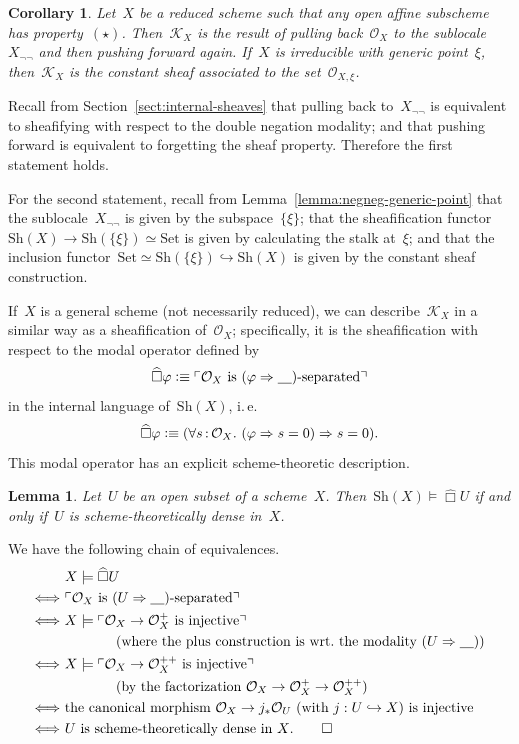 \documentclass[10pt,reqno,a4paper]{amsbook}
\makeatletter
\theoremstyle{definition}
\theoremstyle{plain}
\newtheorem{cor}[defn]{Corollary}
\newtheorem{lemma}[defn]{Lemma}
\theoremstyle{remark}
\renewcommand{\O}{\mathcal{O}}
\newcommand{\K}{\mathcal{K}}
\newcommand{\placeholder}{\underline{\quad}}
\newcommand{\Set}{\mathrm{Set}}
\newcommand{\Sh}{\mathrm{Sh}}
\newcommand{\?}{\,{:}\,}
\renewcommand{\_}{\mathpunct{.}\,}
\newcommand{\speak}[1]{\ulcorner\text{\textnormal{#1}}\urcorner}
\newcommand{\sdense}{{\widehat\Box}}
\newcommand{\ie}{i.\,e.\@\xspace}
\newcommand{\defequiv}{\vcentcolon\equiv}
\renewenvironment{proof}[1][\proofname]{\par
  \pushQED{\qed}%
  \normalfont \topsep6\p@\@plus6\p@\relax
  \trivlist
  \item[\hskip\labelsep
        \itshape
    #1\@addpunct{.}]\ignorespaces
}{%
  \popQED\endtrivlist\@endpefalse
}
\makeatother
\begin{document}
\begin{cor}Let~$X$ be a reduced scheme such that any open affine subscheme has
property~$(\star)$. Then~$\K_X$ is the result of
pulling back~$\O_X$ to the sublocale~$X_{\neg\neg}$ and then pushing forward
again. If~$X$ is irreducible with generic point~$\xi$, then~$\K_X$ is the
constant sheaf associated to the set~$\O_{X,\xi}$.\end{cor}
\begin{proof}Recall from Section~\ref{sect:internal-sheaves} that pulling back
to~$X_{\neg\neg}$ is equivalent to sheafifying with respect to the double
negation modality; and that pushing forward is equivalent to forgetting the
sheaf property. Therefore the first statement holds.

For the second statement, recall from Lemma~\ref{lemma:negneg-generic-point} that the
sublocale~$X_{\neg\neg}$ is given by the subspace~$\{\xi\}$; that the
sheafification functor~$\Sh(X) \to \Sh(\{\xi\}) \simeq \Set$ is given by
calculating the stalk at~$\xi$; and that the inclusion functor~$\Set \simeq
\Sh(\{\xi\}) \hookrightarrow \Sh(X)$ is given by the constant sheaf
construction.
\end{proof}

If~$X$ is a general scheme (not necessarily reduced),
we can describe~$\K_X$ in a similar way as a sheafification
of~$\O_X$; specifically, it is the sheafification with respect to the modal
operator defined by
\[ \sdense\varphi \defequiv \speak{$\O_X$ is~$(\varphi \Rightarrow
\placeholder)$-separated} \]
in the internal language of~$\Sh(X)$, \ie
\[ \sdense\varphi \defequiv (\forall s\?\O_X\_ (\varphi \Rightarrow s = 0)
\Rightarrow s = 0). \]
This modal operator has an explicit scheme-theoretic description.

\begin{lemma}\label{lemma:scheme-theoretical-denseness}
Let~$U$ be an open subset of a scheme~$X$. Then~$\Sh(X) \models
\sdense U$ if and only if~$U$ is scheme-theoretically dense in~$X$.
\end{lemma}
\begin{proof}We have the following chain of equivalences.
\begin{align*}
  &\ X \models \sdense U \\
  \Longleftrightarrow&\
    \speak{$\O_X$ is~$(U \Rightarrow \placeholder)$-separated} \\
  \Longleftrightarrow&\
    X \models \speak{$\O_X \to \O_X^{+}$ is injective} \\
  &\qquad\qquad\text{(where the plus construction is wrt.\@ the modality~$(U \Rightarrow \placeholder)$)} \\
  \Longleftrightarrow&\
    X \models \speak{$\O_X \to \O_X^{++}$ is injective} \\
  &\qquad\qquad\text{(by the factorization~$\O_X \to \O_X^{+} \to \O_X^{++}$)} \\
  \Longleftrightarrow&\
    \text{the canonical morphism~$\O_X \to j_* \O_U$
    (with $j : U \hookrightarrow X$) is injective} \\
  \Longleftrightarrow&\
    \text{$U$ is scheme-theoretically dense in~$X$.} \qedhere
\end{align*}
\end{proof}
\end{document}
